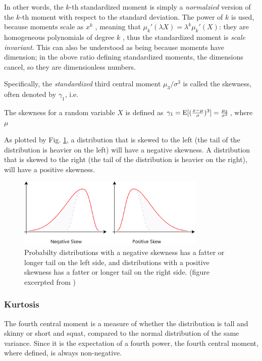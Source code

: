 In other words, the $ k $-th standardized moment is simply a \textit{normalzied} version of the $ k $-th moment with respect to the standard deviation. The power of $ k $ is used, because moments scale as $ x^k $ , meaning that $ \mu_k'(\lambda X) = \lambda^k \mu_k'(X) $:  they are homogeneous polynomials of degree $ k $ , thus the standardized moment is \textit{scale invariant}. This can also be understood as being because moments have dimension; in the above ratio defining standardized moments, the dimensions cancel, so they are dimensionless numbers.

Specifically, the \textit{standardized} third central moment $ \mu_3 / \sigma^3 $ is called the skewness, often denoted by $ \gamma_1 $, i.e.

\begin{defn}
The skewness for a random variable $ X $ is defined as $ \gamma_1 = \E[(\frac{x-\mu}{\sigma})^3] = \frac{\mu_3}{\sigma^3} $, where $ \mu $  
\end{defn}

As plotted by Fig. \ref{fig:ch1_skew}, a distribution that is skewed to the left (the tail of the distribution is heavier on the left) will have a negative skewness. A distribution that is skewed to the right (the tail of the distribution is heavier on the right), will have a positive skewness.

\begin{figure}[htbp]
\begin{center}
\includegraphics[width=0.8\textwidth]{figures/ch1_skew.eps}
\caption{Probabilty distributions with a negative skewness has a fatter or longer tail on the left side, and distributions with a positive skewness has a fatter or longer tail on the right side. (figure excerpted from \cite{www-wiki-skewness})}
\label{fig:ch1_skew}
\end{center}
\end{figure}

\subsubsection{Kurtosis}
The fourth central moment is a measure of whether the distribution is tall and skinny or short and squat, compared to the normal distribution of the same variance. Since it is the expectation of a fourth power, the fourth central moment, where defined, is always non-negative. 

